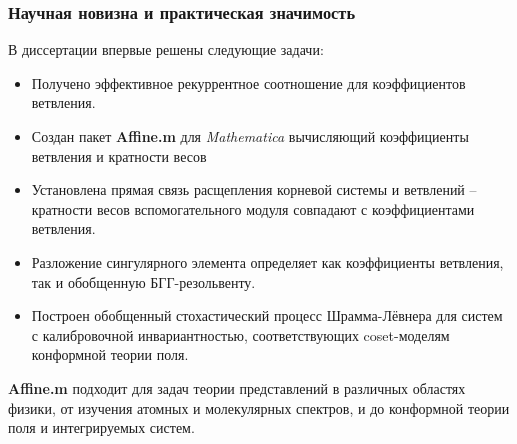 \documentclass[pdftex]{beamer}
\theoremstyle{definition} \newtheorem{Def}{Определение}
\begin{document}
\begin{frame}
  \frametitle{Научная новизна и практическая значимость}
  В диссертации впервые решены следующие задачи:
  \begin{itemize}
  \item Получено эффективное рекуррентное соотношение для коэффициентов ветвления.
  \item Создан пакет {\bf Affine.m} для {\it Mathematica} вычисляющий коэффициенты ветвления и кратности весов
  \item Установлена прямая связь расщепления корневой системы и ветвлений -- кратности весов вспомогательного модуля совпадают с коэффициентами
    ветвления.
  \item Разложение сингулярного элемента определяет как коэффициенты ветвления, так и обобщенную БГГ-резольвенту.
  \item Построен обобщенный стохастический процесс Шрамма-Лёвнера для систем с
    калибровочной инвариантностью, соответствующих coset-моделям конформной теории поля.
  \end{itemize}
  \vspace{-4pt}
  \begin{block}{}
  {\bf Affine.m} подходит для задач теории представлений в различных областях физики, от изучения
  атомных и молекулярных спектров, и до конформной теории поля и интегрируемых систем.
  \end{block}

\end{frame}
\end{document}
